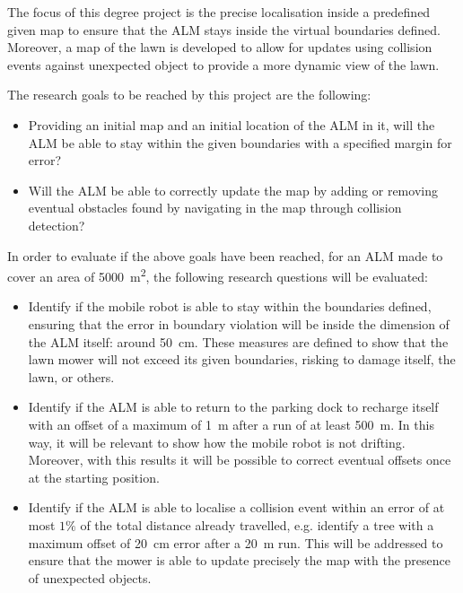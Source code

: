 The focus of this degree project is the precise localisation inside a predefined given map to ensure that the \gls{ALM} stays inside the virtual boundaries defined.
Moreover, a map of the lawn is developed to allow for updates using collision events against unexpected object to provide a more dynamic view of the lawn.

The research goals to be reached by this project are the following:
\begin{itemize}
    \item Providing an initial map and an initial location of the \gls{ALM} in it, will the \gls{ALM} be able to stay within the given boundaries with a specified margin for error?
    \item Will the \gls{ALM} be able to correctly update the map by adding or removing eventual obstacles found by navigating in the map through collision detection?
\end{itemize}

In order to evaluate if the above goals have been reached, for an \gls{ALM} made to cover an area of \SI{5000}{\meter\squared}, the following research questions will be evaluated:
\begin{itemize}
    \item Identify if the mobile robot is able to stay within the boundaries defined, ensuring that the error in boundary violation will be inside the dimension of the \gls{ALM} itself: around \SI{50}{\cm}.
    These measures are defined to show that the lawn mower will not exceed its given boundaries, risking to damage itself, the lawn, or others.
    \item Identify if the \gls{ALM} is able to return to the parking dock to recharge itself with an offset of a maximum of \SI{1}{\m} after a run of at least \SI{500}{\m}. In this way, it will be relevant to show how the mobile robot is not drifting.
    Moreover, with this results it will be possible to correct eventual offsets once at the starting position.
    \item Identify if the \gls{ALM} is able to localise a collision event within an error of at most $1\%$ of the total distance already travelled, e.g. identify a tree with a maximum offset of \SI{20}{\cm} error after a \SI{20}{\m} run.
    This will be addressed to ensure that the mower is able to update precisely the map with the presence of unexpected objects.
\end{itemize}


